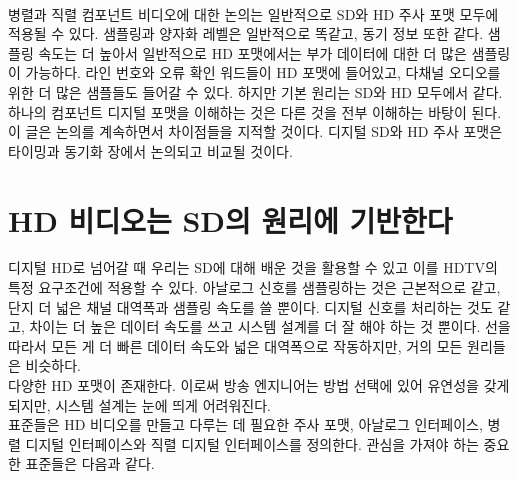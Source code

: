 \\
병렬과 직렬 컴포넌트 비디오에 대한 논의는 일반적으로 SD와 HD 주사 포맷 모두에 적용될 수 있다. 샘플링과 양자화 레벨은 일반적으로 똑같고, 동기 정보 또한 같다. 샘플링 속도는 더 높아서 일반적으로 HD 포맷에서는 부가 데이터에 대한 더 많은 샘플링이 가능하다.
라인 번호와 오류 확인 워드들이 HD 포맷에 들어있고, 다채널 오디오를 위한 더 많은 샘플들도 들어갈 수 있다. 하지만 기본 원리는 SD와 HD 모두에서 같다. 하나의 컴포넌트 디지털 포맷을 이해하는 것은 다른 것을 전부 이해하는 바탕이 된다.
이 글은 논의를 계속하면서 차이점들을 지적할 것이다. 디지털 SD와 HD 주사 포맷은 타이밍과 동기화 장에서 논의되고 비교될 것이다.

\section{HD 비디오는 SD의 원리에 기반한다}
디지털 HD로 넘어갈 때 우리는 SD에 대해 배운 것을 활용할 수 있고 이를 HDTV의 특정 요구조건에 적용할 수 있다. 아날로그 신호를 샘플링하는 것은 근본적으로 같고, 단지 더 넓은 채널 대역폭과 샘플링 속도를 쓸 뿐이다.
디지털 신호를 처리하는 것도 같고, 차이는 더 높은 데이터 속도를 쓰고 시스템 설계를 더 잘 해야 하는 것 뿐이다. 선을 따라서 모든 게 더 빠른 데이터 속도와 넓은 대역폭으로 작동하지만, 거의 모든 원리들은 비슷하다.
\\
다양한 HD 포맷이 존재한다. 이로써 방송 엔지니어는 방법 선택에 있어 유연성을 갖게 되지만, 시스템 설계는 눈에 띄게 어려워진다.
\\
표준들은 HD 비디오를 만들고 다루는 데 필요한 주사 포맷, 아날로그 인터페이스, 병렬 디지털 인터페이스와 직렬 디지털 인터페이스를 정의한다. 관심을 가져야 하는 중요한 표준들은 다음과 같다.

